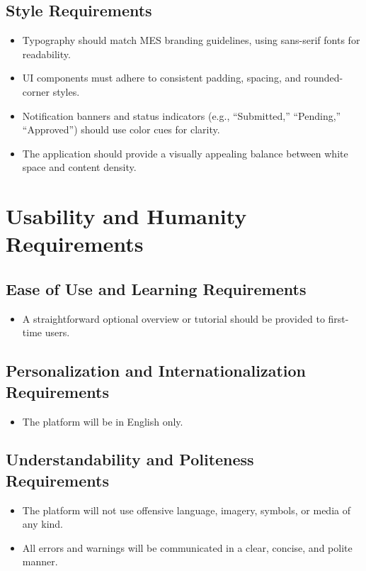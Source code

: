 \documentclass[12pt]{article}
\begin{document}
    \subsection{Style Requirements}
    \begin{itemize}
        \item Typography should match MES branding guidelines, using sans-serif fonts for readability.
        \item UI components must adhere to consistent padding, spacing, and rounded-corner styles.
        \item Notification banners and status indicators (e.g., “Submitted,” “Pending,” “Approved”) should use color cues for clarity.
        \item The application should provide a visually appealing balance between white space and content density.
    \end{itemize}
\section{Usability and Humanity Requirements}
  \subsection{Ease of Use and Learning Requirements}
    \begin{itemize}
      \item A straightforward optional overview or tutorial should be provided to first-time users.
    \end{itemize}

  \subsection{Personalization and Internationalization Requirements}
    \begin{itemize}
      \item The platform will be in English only.
    \end{itemize}

  \subsection{Understandability and Politeness Requirements}
    \begin{itemize}
      \item The platform will not use offensive language, imagery, symbols, or media of any kind.
      \item All errors and warnings will be communicated in a clear, concise, and polite manner.
    \end{itemize}
\end{document}

